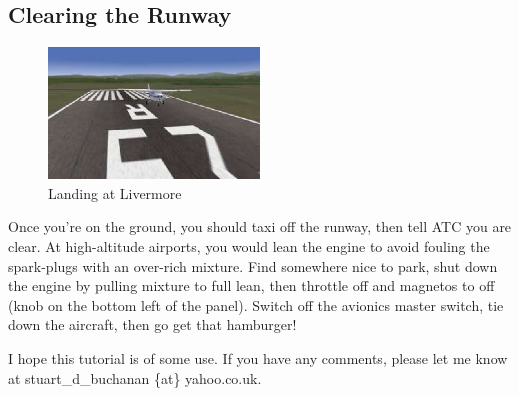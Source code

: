 \subsection{Clearing the Runway}

\begin{figure}[!htp]
\centering
\includegraphics[width=0.5\textwidth]{landing}
\caption{Landing at Livermore}
\end{figure}

Once you're on the ground, you should taxi off the runway, then tell ATC you are clear. At high-altitude airports, you would lean the engine to avoid fouling the spark-plugs with an over-rich mixture. Find somewhere nice to park, shut down the engine by pulling mixture to full lean, then throttle off and magnetos to off (knob on the bottom left of the panel). Switch off the avionics master switch, tie down the aircraft, then go get that hamburger!

I hope this tutorial is of some use. If you have any comments, please let me know at stuart\_d\_buchanan \{at\} yahoo.co.uk.
